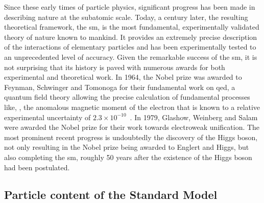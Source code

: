 Since these early times of particle physics, significant progress has been made in describing nature at the subatomic scale.
Today, a century later, the resulting theoretical framework, the \gls{sm}, is the most fundamental, experimentally validated theory of nature known to mankind.
It provides an extremely precise description of the interactions of elementary particles and has been experimentally tested to an unprecedented level of accuracy. Given the remarkable success of the \gls{sm}, it is not surprising that its history is paved with numerous awards for both experimental and theoretical work.
In 1964, the Nobel prize was awarded to Feynman, Schwinger and Tomonoga for their fundamental work on \gls{qed}, a quantum field theory allowing the precise calculation of fundamental processes like, \eg, the anomalous magnetic moment of the electron that is known to a relative experimental uncertainty of $2.3 \times 10^{-10}$~\cite{Mohr:2015ccw}.
In 1979, Glashow, Weinberg and Salam were awarded the Nobel prize for their work towards electroweak unification.
The most prominent recent progress is undoubtedly the discovery of the Higgs boson, not only resulting in the Nobel prize being awarded to Englert and Higgs, but also completing the \gls{sm}, roughly 50 years after the existence of the Higgs boson had been postulated. 

		
\subsection{Particle content of the Standard Model}

